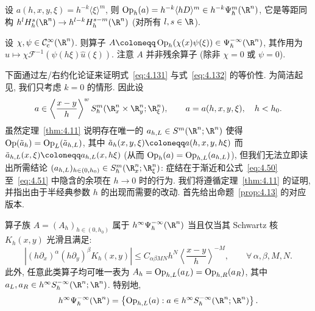 \begin{example}[移阶算子]\label{eg:4.45}
设 $a(h, x, y, \xi) = h^{-k} \langle \xi \rangle^m$, 则 $\Op_h(a) = h^{-k} \langle h D \rangle^m \in h^{-k} \Psi_\hbar^m(\R^n)$, 它是等距同构 $h^l H_h^s(\R^n) \to h^{l-k} H_h^{s-m}(\R^n)$ (对所有 $l, s \in \R$).
\end{example}

\begin{example}[微局部化算子]\label{eg:4.46}
设 $\chi, \psi \in \SmoothComp(\R^n)$. 则算子 $A \defeq \Op_h(\chi(x) \psi(\xi)) \in \Psi_\hbar^{-\infty}(\R^n)$, 其作用为 $u \mapsto \chi \mathcal{F}^{-1}(\psi(h \xi) \hat{u}(\xi))$. 注意 $A$ 并非残余算子 (除非 $\chi = 0$ 或 $\psi = 0$).
\end{example}

下面通过左/右约化论证来证明式~\eqref{eq:4.131} 与式~\eqref{eq:4.132} 的等价性. 为简洁起见, 我们只考虑 $k = 0$ 的情形. 因此设
\begin{equation}\label{eq:4.133}
    a \in \left\langle \frac{x-y}{h} \right\rangle^w S_\hbar^m(\R_x^n \times \R_y^n; \R_\xi^n), \qquad a = a(h, x, y, \xi), \quad h < h_0.
\end{equation}
虽然定理~\ref{thm:4.11} 说明存在唯一的 $a_{h, L} \in S^m(\R^n; \R^n)$ 使得 $\operatorname{Op}(\tilde{a}_h) = \operatorname{Op}_L(\tilde{a}_{h, L})$, 其中 $\tilde{a}_h(x, y, \xi) \defeq a(h, x, y, h \xi)$ 而 $\tilde{a}_{h, L}(x, \xi) \defeq a_{h, L}(x, h \xi)$ (从而 $\operatorname{Op}_h(a) = \operatorname{Op}_{h, L}(a_{h, L})$), 但我们无法立即读出所需结论 $(a_{h, L})_{h \in (0, h_0)} \in S_\hbar^m(\R_x^n; \R_\xi^n)$: 症结在于渐近和公式~\eqref{eq:4.50} 至~\eqref{eq:4.51} 中隐含的余项在 $h \to 0$ 时的行为. 我们将遵循定理~\ref{thm:4.11} 的证明, 并指出由于半经典参数 $h$ 的出现而需要的改动. 首先给出命题~\ref{prop:4.13} 的对应版本.

\begin{lemma}[残余半经典算子]\label{lem:4.47}
算子族 $A = (A_h)_{h \in (0, h_0)}$ 属于 $h^\infty \Psi_\hbar^{-\infty}(\R^n)$ 当且仅当其 Schwartz 核 $K_h(x, y)$ 光滑且满足:
\begin{equation}\label{eq:4.134}
    |(h \partial_x)^\alpha (h \partial_y)^\beta K_h(x, y)| \le C_{\alpha\beta M N} h^N \left\langle \frac{x-y}{h} \right\rangle^{-M}, \qquad \forall\,\alpha, \beta, M, N.
\end{equation}
此外, 任意此类算子均可唯一表为 $A_h = \operatorname{Op}_{h, L}(a_L) = \operatorname{Op}_{h, R}(a_R)$, 其中 $a_L, a_R \in h^\infty S_\hbar^{-\infty}(\R^n; \R^n)$. 特别地,
\begin{equation}\label{eq:4.135}
    h^\infty \Psi_\hbar^{-\infty}(\R^n) = \left\{ \Op_{h, L}(a) : a \in h^\infty S_\hbar^{-\infty}(\R^n; \R^n) \right\}.
\end{equation}
\end{lemma}

